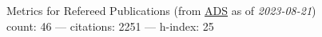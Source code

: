 Metrics for Refereed Publications (from \href{\adsurl}{ADS} as of \textit{2023-08-21}) \\count: 46 --- citations: 2251 --- h-index: 25